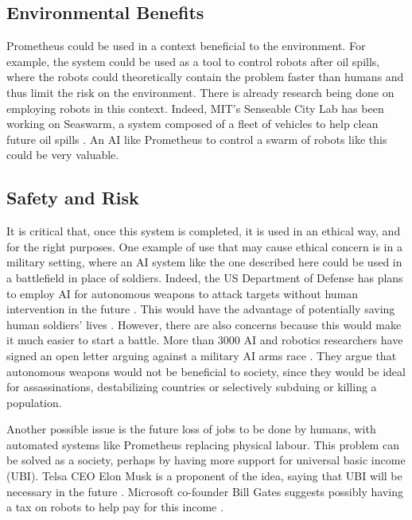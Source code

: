 \documentclass[titlepage,11pt]{article}
\begin{document}
\subsection{Environmental Benefits}

Prometheus could be used in a context beneficial to the environment. For example, the system could be used as a tool to control robots after oil spills, where the robots could theoretically contain the problem faster than humans and thus limit the risk on the environment. There is already research being done on employing robots in this context. Indeed, MIT's Senseable City Lab has been working on Seaswarm, a system composed of a fleet of vehicles to help clean future oil spills \cite{seaswarm}. An AI like Prometheus to control a swarm of robots like this could be very valuable. 

\subsection{Safety and Risk}

It is critical that, once this system is completed, it is used in an ethical way, and for the right purposes. One example of use that may cause ethical concern is in a military setting, where an AI system like the one described here could be used in a battlefield in place of soldiers. Indeed, the US Department of Defense has plans to employ AI for autonomous weapons to attack targets without human intervention in the future \cite{military}. This would have the advantage of potentially saving human soldiers' lives \cite{define_military_ai}. However, there are also concerns because this would make it much easier to start a battle. More than 3000 AI and robotics researchers have signed an open letter arguing against a military AI arms race \cite{openletter}. They argue that autonomous weapons would not be beneficial to society, since they would be ideal for assassinations, destabilizing countries or selectively subduing or killing a population.

Another possible issue is the future loss of jobs to be done by humans, with automated systems like Prometheus replacing physical labour. This problem can be solved as a society, perhaps by having more support for universal basic income (UBI). Telsa CEO Elon Musk is a proponent of the idea, saying that UBI will be necessary in the future \cite{musk}. Microsoft co-founder Bill Gates suggests possibly having a tax on robots to help pay for this income \cite{gates}.
\end{document}
